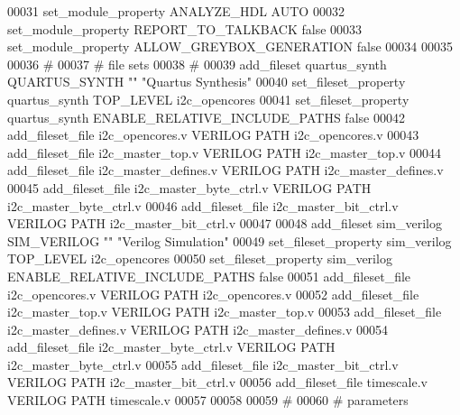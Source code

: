 \begin{DoxyCode}
00031 \textcolor{comment}{}set\_module\_property ANALYZE\_HDL AUTO\textcolor{comment}{}
00032 \textcolor{comment}{}set\_module\_property REPORT\_TO\_TALKBACK false\textcolor{comment}{}
00033 \textcolor{comment}{}set\_module\_property ALLOW\_GREYBOX\_GENERATION false\textcolor{comment}{}
00034 \textcolor{comment}{}
00035 
00036 \textcolor{comment}{# }
00037 \textcolor{comment}{}\textcolor{comment}{# file sets}
00038 \textcolor{comment}{}\textcolor{comment}{# }
00039 \textcolor{comment}{}add\_fileset quartus\_synth QUARTUS\_SYNTH "" "Quartus Synthesis"\textcolor{comment}{}
00040 \textcolor{comment}{}set\_fileset\_property quartus\_synth TOP\_LEVEL i2c\_opencores\textcolor{comment}{}
00041 \textcolor{comment}{}set\_fileset\_property quartus\_synth ENABLE\_RELATIVE\_INCLUDE\_PATHS false\textcolor{comment}{}
00042 \textcolor{comment}{}add\_fileset\_file i2c\_opencores.v VERILOG PATH i2c\_opencores.v\textcolor{comment}{}
00043 \textcolor{comment}{}add\_fileset\_file i2c\_master\_top.v VERILOG PATH i2c\_master\_top.v\textcolor{comment}{}
00044 \textcolor{comment}{}add\_fileset\_file i2c\_master\_defines.v VERILOG PATH i2c\_master\_defines.v\textcolor{comment}{}
00045 \textcolor{comment}{}add\_fileset\_file i2c\_master\_byte\_ctrl.v VERILOG PATH i2c\_master\_byte\_ctrl.v\textcolor{comment}{}
00046 \textcolor{comment}{}add\_fileset\_file i2c\_master\_bit\_ctrl.v VERILOG PATH i2c\_master\_bit\_ctrl.v\textcolor{comment}{}
00047 \textcolor{comment}{}
00048 add\_fileset sim\_verilog SIM\_VERILOG "" "Verilog Simulation"\textcolor{comment}{}
00049 \textcolor{comment}{}set\_fileset\_property sim\_verilog TOP\_LEVEL i2c\_opencores\textcolor{comment}{}
00050 \textcolor{comment}{}set\_fileset\_property sim\_verilog ENABLE\_RELATIVE\_INCLUDE\_PATHS false\textcolor{comment}{}
00051 \textcolor{comment}{}add\_fileset\_file i2c\_opencores.v VERILOG PATH i2c\_opencores.v\textcolor{comment}{}
00052 \textcolor{comment}{}add\_fileset\_file i2c\_master\_top.v VERILOG PATH i2c\_master\_top.v\textcolor{comment}{}
00053 \textcolor{comment}{}add\_fileset\_file i2c\_master\_defines.v VERILOG PATH i2c\_master\_defines.v\textcolor{comment}{}
00054 \textcolor{comment}{}add\_fileset\_file i2c\_master\_byte\_ctrl.v VERILOG PATH i2c\_master\_byte\_ctrl.v\textcolor{comment}{}
00055 \textcolor{comment}{}add\_fileset\_file i2c\_master\_bit\_ctrl.v VERILOG PATH i2c\_master\_bit\_ctrl.v\textcolor{comment}{}
00056 \textcolor{comment}{}add\_fileset\_file timescale.v VERILOG PATH timescale.v\textcolor{comment}{}
00057 \textcolor{comment}{}
00058 
00059 \textcolor{comment}{# }
00060 \textcolor{comment}{}\textcolor{comment}{# parameters}

\end{DoxyCode}
